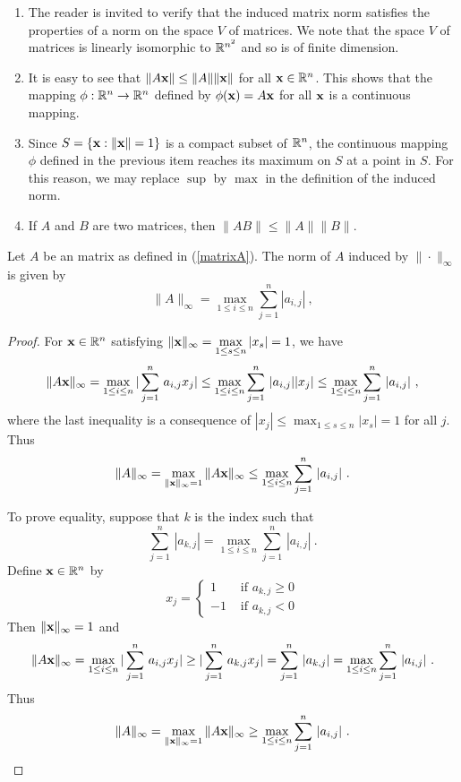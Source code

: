 \begin{rmkList}\label{nABppnAnB}
\begin{enumerate}
\item The reader is invited to verify that the induced matrix norm
satisfies the properties of a norm on the space $V$ of \nn matrices.
We note that the space $V$ of \nn matrices is linearly isomorphic to
$\mathbb{R}^{n^2}$ and so is of finite dimension.
\item It is easy to see that $\|A\mathbf{x}\| \leq \|A\|\|\mathbf{x}\|$ for
all $\mathbf{x} \in \mathbb{R}^n$.  This shows that the mapping
$\phi:\mathbb{R}^n \to \mathbb{R}^n$ defined by $\phi(\mathbf{x}) = A\mathbf{x}$ for all
$\mathbf{x}$ is a continuous mapping. \label{MatrNormP1}
\item Since $S = \{ \mathbf{x} : \|\mathbf{x}\| = 1\}$ is a compact subset of
$\mathbb{R}^n$, the continuous mapping $\phi$ defined in the previous item
reaches its maximum on $S$ at a point in $S$.   For this reason, we
may replace $\sup$ by $\max$ in the definition of the induced norm.
\item If $A$ and $B$ are two \nn matrices, then
$\|AB\| \leq \|A\|\|B\|$. \label{MatrNormP2}
\end{enumerate}
\end{rmkList}

\begin{theorem}
Let $A$ be an \nn matrix as defined in (\ref{matrixA}).  The
norm of $A$ induced by $\|\cdot\|_\infty$ is given by
\[
\displaystyle \| A \|_\infty
= \max_{1\leq i \leq n} \sum_{j=1}^{n} | a_{i,j} | \ ,
\]
\label{normAinfty}
\end{theorem}

\begin{proof}
For $\mathbf{x} \in \mathbb{R}^n$ satisfying
$\displaystyle \|\mathbf{x}\|_\infty = \max_{1\leq s \leq n} |x_s| = 1$,
we have
\[
\|A\mathbf{x}\|_\infty
= \max_{1\leq i \leq n} |\sum_{j=1}^n\,a_{i,j}x_j|
\leq \max_{1\leq i \leq n} \sum_{j=1}^n\,|a_{i,j}| |x_j|
\leq \max_{1\leq i \leq n} \sum_{j=1}^n\,|a_{i,j}| \ ,
\]
where the last inequality is a consequence of
$\displaystyle |x_j| \leq \max_{1\leq s \leq n} |x_s| = 1$ for all
$j$.  Thus
\[
\|A\|_\infty = \max_{\|\mathbf{x} \|_\infty =1 } \| A \mathbf{x} \|_\infty
\leq \max_{1\leq i \leq n} \sum_{j=1}^n\,|a_{i,j}| \ .
\]

To prove equality, suppose that $k$ is the index such that
\[
\sum_{j=1}^n\,|a_{k,j}| = \max_{1\leq i \leq n} \sum_{j=1}^n\,|a_{i,j}| \ .
\]
Define $\mathbf{x} \in \mathbb{R}^n$ by
\[
x_j = \begin{cases}
1 & \text{ if $a_{k,j} \geq 0$}\\
-1 & \text{ if $a_{k,j} < 0$}
\end{cases}
\]
Then $\|\mathbf{x}\|_\infty = 1$ and
\[
\|A\mathbf{x}\|_\infty =
\max_{1\leq i \leq n} |\sum_{j=1}^n\,a_{i,j}x_j|
\geq |\sum_{j=1}^n\,a_{k,j}x_j|
= \sum_{j=1}^n\,|a_{k,j}|
=\max_{1\leq i \leq n} \sum_{j=1}^n\,|a_{i,j}| \ .
\]
Thus
\[
\|A\|_\infty = \max_{\|\VEC{x} \|_\infty =1 } \| A \VEC{x} \|_\infty
\geq \max_{1\leq i \leq n} \sum_{j=1}^n\,|a_{i,j}| \ .  \qedhere
\]
\end{proof}

